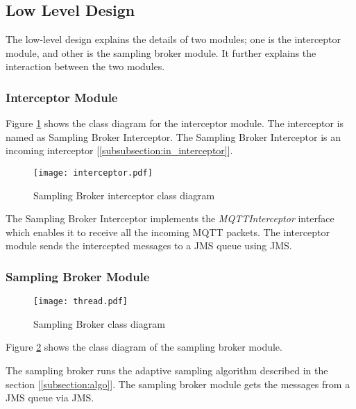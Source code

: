 \subsection{Low Level Design}

The low-level design explains the details of two modules; one is the interceptor module, and other is the sampling broker module. It further explains the interaction between the two modules.

\subsubsection{Interceptor Module}

Figure \ref{figures:artemis_interceptor} shows the class diagram for the interceptor module. The interceptor is named as Sampling Broker Interceptor. The Sampling Broker Interceptor is an incoming interceptor [\ref{subsubsection:in_interceptor}].

\makeatletter
\setlength{\intextsep}{20pt}
\makeatother

\begin{figure}[h!]
\centering
\texttt{[image: interceptor.pdf]}
\caption{Sampling Broker interceptor class diagram}\label{figures:artemis_interceptor}
\end{figure}

The Sampling Broker Interceptor implements the \textit{MQTTInterceptor} interface which enables it to receive all the incoming MQTT packets. The interceptor module sends the intercepted messages to a JMS queue using JMS.

\subsubsection{Sampling Broker Module}

\begin{figure}[h!]
\centering
\texttt{[image: thread.pdf]}
\caption{Sampling Broker class diagram}\label{figures:artemis_thread}
\end{figure}

Figure \ref{figures:artemis_thread} shows the class diagram of the sampling broker module.

The sampling broker runs the adaptive sampling algorithm described in the section [\ref{subsection:algo}]. The sampling broker module gets the messages from a JMS queue via JMS.

